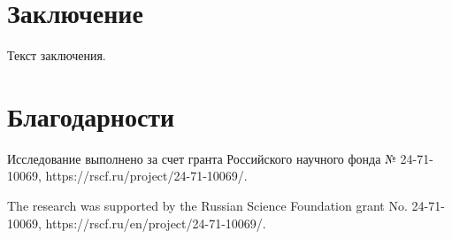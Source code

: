 \documentclass[utf8, babel, sor, jor, amsmath, amssymb, reprint]{elsarticle} %
\begin{document}
\section{Заключение}


Текст заключения.


\section{Благодарности}

Исследование выполнено за счет гранта Российского научного фонда № 24-71-10069, https://rscf.ru/project/24-71-10069/.

The research was supported by the Russian Science Foundation grant No. 24-71-10069, https://rscf.ru/en/project/24-71-10069/.


\end{document}
